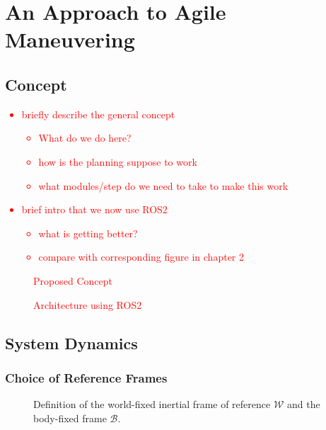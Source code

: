 
\chapter{An Approach to Agile Maneuvering}
\label{sec:approach-to-agile-maneuvering}

\section{Concept}
\textcolor{red}{
\begin{itemize}
    \item briefly describe the general concept
    \begin{itemize}
        \item What do we do here?
        \item how is the planning suppose to work
        \item what modules/step do we need to take to make this work
    \end{itemize} 
    \item brief intro that we now use ROS2
    \begin{itemize}
        \item what is getting better?
        \item compare with corresponding figure in chapter 2
    \end{itemize}
\end{itemize}}

\begin{figure}[tb]
    \centering
    \caption{\textcolor{red}{Proposed Concept}}
    \label{fig:my_label}
\end{figure}
\begin{figure}[tb]
    \centering
    \caption{\textcolor{red}{Architecture using ROS2}}
    \label{fig:my_label1}
\end{figure}

\section{System Dynamics}
\label{sec:system-dynamics}

\subsection{Choice of Reference Frames}
\begin{figure}[h!]
	\centering
	
	\caption{Definition of the world-fixed inertial frame of reference $\mathcal{W}$ and the body-fixed frame $\mathcal{B}$.}
\end{figure}

